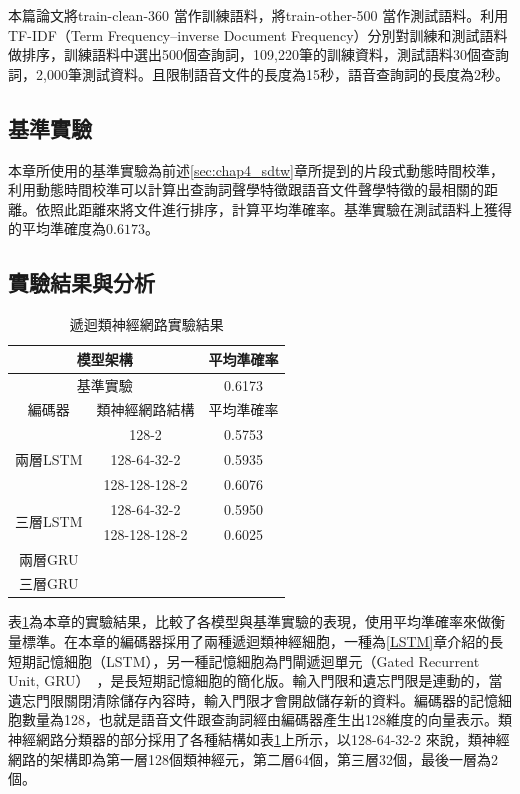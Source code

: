  本篇論文將train-clean-360 當作訓練語料，將train-other-500
 當作測試語料。利用TF-IDF（Term Frequency–inverse Document
 Frequency）分別對訓練和測試語料做排序，訓練語料中選出500個查詢詞，109,220筆的訓練資料，測試語料30個查詢詞，2,000筆測試資料。且限制語音文件的長度為15秒，語音查詢詞的長度為2秒。
\subsection{基準實驗}
本章所使用的基準實驗為前述\ref{sec:chap4_sdtw}章所提到的片段式動態時間校準，利用動態時間校準可以計算出查詢詞聲學特徵跟語音文件聲學特徵的最相關的距離。依照此距離來將文件進行排序，計算平均準確率。基準實驗在測試語料上獲得的平均準確度為$0.6173$。
\subsection{實驗結果與分析}
 \begin{table}[ht]
	 \centering
	 \caption{遞迴類神經網路實驗結果}

	 \label{table:ch3_exp}
	 \begin{tabular}{|c|c|c|}
		 \hline
		 \multicolumn{2}{|c|}{模型架構} & 平均準確率 \\
		 \hline
		 \multicolumn{2}{|c|}{基準實驗} & 0.6173 \\
		 \hline
		 \hline 

		 編碼器 & 類神經網路結構 & 平均準確率  \\
		 \hline

		 \multirow{3}{*}{兩層LSTM} & 128-2 & 0.5753\\
		 \cline{2-3}
		 & 128-64-32-2 & 0.5935 \\
		 \cline{2-3}
		 & 128-128-128-2 & 0.6076\\
		 \hline
		 \multirow{2}{*}{三層LSTM} & 128-64-32-2 & 0.5950 \\
		 \cline{2-3}
		 & 128-128-128-2 & 0.6025 \\
		 \hline

		 \multirow{2}{*}{兩層GRU} &  &  \\
		 \cline{2-3}
		 &  &  \\
		 \hline
		 \multirow{2}{*}{三層GRU} &  &  \\
		 \cline{2-3}
		 &  &  \\
		 \hline
	   \end{tabular}
 \end{table}

表\ref{table:ch3_exp}為本章的實驗結果，比較了各模型與基準實驗的表現，使用平均準確率來做衡量標準。在本章的編碼器採用了兩種遞迴類神經細胞，一種為\ref{LSTM}章介紹的長短期記憶細胞（LSTM），另一種記憶細胞為門閘遞迴單元（Gated
Recurrent Unit,
GRU）~\cite{cho2014learning}，是長短期記憶細胞的簡化版。輸入門限和遺忘門限是連動的，當遺忘門限關閉清除儲存內容時，輸入門限才會開啟儲存新的資料。編碼器的記憶細胞數量為128，也就是語音文件跟查詢詞經由編碼器產生出128維度的向量表示。類神經網路分類器的部分採用了各種結構如表\ref{table:ch3_exp}上所示，以128-64-32-2
來說，類神經網路的架構即為第一層128個類神經元，第二層64個，第三層32個，最後一層為2個。

